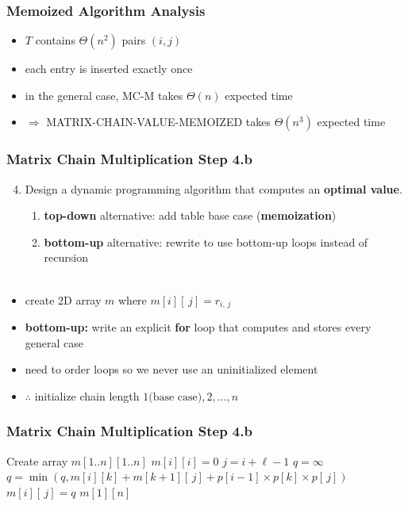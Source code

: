 \documentclass{beamer}
\newcommand{\stanza}{ \\~\ }
\begin{document}
\begin{frame} \frametitle{Memoized Algorithm Analysis}
  \begin{itemize}
    \item $T$ contains $\Theta(n^2)$ pairs $(i, j)$
    \item each entry is inserted exactly once
    \item in the general case, MC-M takes $\Theta(n)$ expected time
    \item $\Rightarrow$ MATRIX-CHAIN-VALUE-MEMOIZED takes $\Theta(n^3)$ expected time
  \end{itemize}
\end{frame}

\begin{frame} \frametitle{Matrix Chain Multiplication Step 4.b}
  \begin{enumerate}
    \setcounter{enumi}{3}
    \item Design a dynamic programming algorithm that computes an \textbf{optimal value}.
    \begin{enumerate}
      \item \textbf{top-down} alternative: add table base case (\textbf{memoization})
      \item \textbf{bottom-up} alternative: rewrite to use bottom-up loops instead of recursion
      \stanza
    \end{enumerate}
\end{enumerate}

\begin{itemize}
  \item create 2D array $m$ where $m[i][\, j] = r_{i, \, j}$
  \item \textbf{bottom-up:} write an explicit \textbf{for} loop that computes and stores every general case
  \item need to order loops so we never use an uninitialized element
  \item $\therefore$ initialize chain length $1 \text{(base case)}, 2, \ldots, n$
\end{itemize}
\end{frame}

\begin{frame} \frametitle{Matrix Chain Multiplication Step 4.b}
  {\footnotesize
  \begin{algorithmic}[1]
    \State Create array $m[1..n][1..n]$
      \State $m[i][i] = 0$ 
    \EndFor
     
        \State $j = i + \ell - 1$
        \State $q=\infty$
          \State $q = \min(q, m[i][k] + m[k+1][\,j] + p[i-1] \times p[k] \times p[\,j])$
        \EndFor
        \State $m[i][\,j] = q$
      \EndFor
    \EndFor
    \State \Return $m[1][n]$
    \EndFunction
  \end{algorithmic}
  }
\end{frame}
\end{document}
